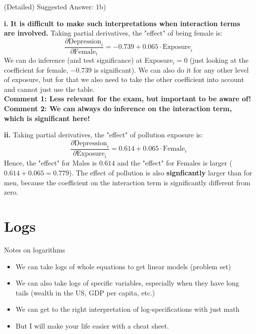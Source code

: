 \documentclass[11pt]{beamer}
\begin{document}
\begin{frame}{(Detailed) Suggested Answer: 1b)}
\footnotesize{
\textbf{i.} \textbf{It is difficult to make such interpretations when interaction terms are involved.} Taking partial derivatives, the "effect" of being female is:
$$ \frac{\partial \text{Depression}_i}{\partial \text{Female}_i} = -0.739 + 0.065\cdot \text{Exposure}_i $$
We can do inference (and test significance) at Exposure$_i=0$ (just looking at the coefficient for female, $-0.739$ is significant). We can also do it for any other level of exposure, but for that we also need to take the other coefficient into account and cannot just use the table.\\
\textbf{Comment 1: Less relevant for the exam, but important to be aware of!} \\
\textbf{Comment 2: We can always do inference on the interaction term, which is significant here!} 

\textbf{ii.} Taking partial derivatives, the "effect" of pollution exposure is:
$$ \frac{\partial \text{Depression}_i}{\partial \text{Exposure}_i} = 0.614 + 0.065\cdot \text{Female}_i $$
Hence, the "effect" for Males is $0.614$ and the "effect" for Females is larger ($0.614+0.065 = 0.779$). The effect of pollution is also \textbf{signficantly} larger than for men, because the coefficient on the interaction term is significantly different from zero.
}
\end{frame}





\section{Logs} 
 \begin{frame}{Notes on logarithms}
     \begin{itemize}
         \item We can take logs of whole equations to get linear models (problem set)
         \item We can also take logs of specific variables, especially when they have long tails (wealth in the US, GDP per capita, etc.)
        \item We can get to the right interpretation of log-specifications with just math \pause
        \item But I will make your life easier with a cheat sheet.
     \end{itemize}
 \end{frame}
\end{document}
